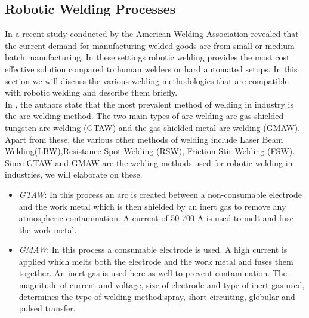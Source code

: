 \newpage
\subsection{Robotic Welding Processes}
In a recent study conducted by the American Welding Association revealed that the current demand for manufacturing welded goods are from small or medium batch manufacturing. In these settings robotic welding provides the most cost effective solution compared to human welders or hard automated setups. In this section we will discuss the various welding methodologies that are compatible with robotic welding and describe them briefly.\\
In \citet{Pires2003}, the authors state that the most prevalent method of welding in industry is the arc welding method. The two main types of arc welding are gas shielded tungsten arc welding (GTAW) and the gas shielded metal arc welding (GMAW). Apart from these, the various other methods of welding include Laser Beam Welding(LBW),Resistance Spot Welding (RSW), Friction Stir Welding (FSW).
Since GTAW and GMAW are the welding methods used for robotic welding in industries, we will elaborate on these.
\begin{itemize}
\item \textit{GTAW}: In this process an arc is created between a non-consumable electrode and the work metal which is then shielded by an inert gas to remove any atmospheric contamination. A current of 50-700 A is used to melt and fuse the work metal.
\item \textit{GMAW}: In this process a consumable electrode is used. A high current is applied which melts both the electrode and the work metal and fuses them together. An inert gas is used here as well to prevent contamination. The magnitude of current and voltage, size of electrode and type of inert gas used, determines the type of welding method:spray, short-circuiting, globular and pulsed transfer.
\end{itemize}

